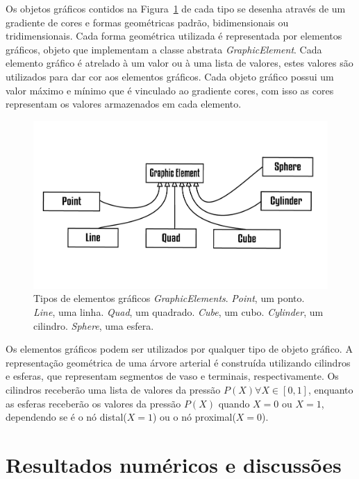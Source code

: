 \documentclass[
        english,			
        brazil			        %
        ,<...>]{abntbibufjf}
\begin{document}
Os objetos gráficos contidos na Figura~\ref{fig7:graphicobjects} de cada tipo se desenha através de um gradiente de cores e formas geométricas padrão, bidimensionais ou tridimensionais. Cada forma geométrica utilizada é representada por elementos gráficos, objeto que implementam a classe abstrata \textit{GraphicElement}. Cada elemento gráfico é atrelado à um valor ou à uma lista de valores, estes valores são utilizados para dar cor aos elementos gráficos. Cada objeto gráfico possui um valor máximo e mínimo que é vinculado ao gradiente cores, com isso as cores representam os valores armazenados em cada elemento.

\begin{figure}[!htbp]
	\centering
	\includegraphics[scale=1]{Figures/GraphicElements}
	\caption{Tipos de elementos gráficos \textit{GraphicElements}. \textit{Point}, um ponto. \textit{Line}, uma linha. \textit{Quad}, um quadrado. \textit{Cube}, um cubo. \textit{Cylinder}, um cilindro. \textit{Sphere}, uma esfera.}
	\label{fig7:graphicobjects}
\end{figure}

Os elementos gráficos podem ser utilizados por qualquer tipo de objeto gráfico. A representação geométrica de uma árvore arterial é construída utilizando cilindros e esferas, que representam segmentos de vaso e terminais, respectivamente. Os cilindros receberão uma lista de valores da pressão $P(X) \forall X \in [0,1]$, enquanto as esferas receberão os valores da pressão $P(X)$ quando $X=0$ ou $X=1$, dependendo se é o nó distal($X=1$) ou o nó proximal($X=0$).



\chapter{Resultados numéricos e discussões}
\end{document}
